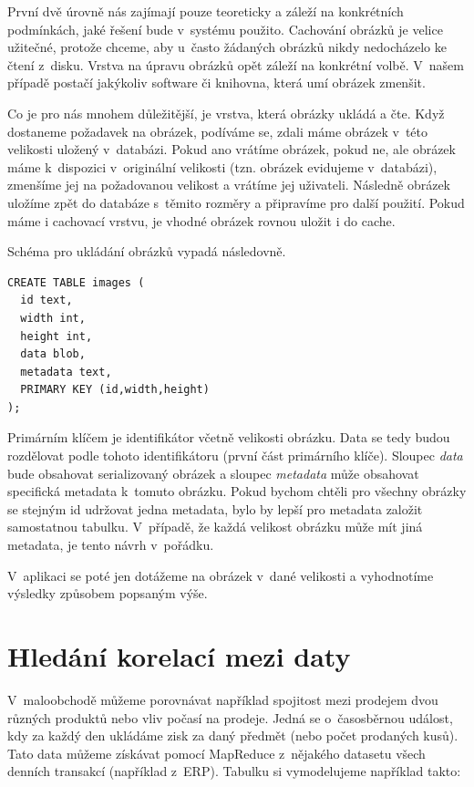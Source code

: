 První dvě úrovně nás zajímají pouze teoreticky a záleží na konkrétních podmínkách, jaké řešení bude v~systému použito. Cachování obrázků je velice užitečné, protože chceme, aby u~často žádaných obrázků nikdy nedocházelo ke čtení z~disku. Vrstva na úpravu obrázků opět záleží na konkrétní volbě. V~našem případě postačí jakýkoliv software či knihovna, která umí obrázek zmenšit. 

Co je pro nás mnohem důležitější, je vrstva, která obrázky ukládá a čte. Když dostaneme požadavek na obrázek, podíváme se, zdali máme obrázek v~této velikosti uložený v~databázi. Pokud ano vrátíme obrázek, pokud ne, ale obrázek máme k~dispozici v~originální velikosti (tzn. obrázek evidujeme v~databázi), zmenšíme jej na požadovanou velikost a vrátíme jej uživateli. Následně obrázek uložíme zpět do databáze s~těmito rozměry a připravíme pro další použití. Pokud máme i cachovací vrstvu, je vhodné obrázek rovnou uložit i do cache. 

Schéma pro ukládání obrázků vypadá následovně. 

\begin{lstlisting}[caption={Tabulka pro ukládání obrázků v~různých velikostech},label=img1]
CREATE TABLE images ( 
  id text,
  width int,
  height int,
  data blob,
  metadata text, 
  PRIMARY KEY (id,width,height) 
);
\end{lstlisting}

Primárním klíčem je identifikátor včetně velikosti obrázku. Data se tedy budou rozdělovat podle tohoto identifikátoru (první část primárního klíče). Sloupec \emph{data} bude obsahovat serializovaný obrázek a sloupec \emph{metadata} může obsahovat specifická metadata k~tomuto obrázku. Pokud bychom chtěli pro všechny obrázky se stejným id udržovat jedna metadata, bylo by lepší pro metadata založit samostatnou tabulku. V~případě, že každá velikost obrázku může mít jiná metadata, je tento návrh v~pořádku. 

V~aplikaci se poté jen dotážeme na obrázek v~dané velikosti a vyhodnotíme výsledky způsobem popsaným výše. 

\section{Hledání korelací mezi daty}
V~maloobchodě můžeme porovnávat například spojitost mezi prodejem dvou různých produktů nebo vliv počasí na prodeje. Jedná se o~časosběrnou událost, kdy za každý den ukládáme zisk za daný předmět (nebo počet prodaných kusů). Tato data můžeme získávat pomocí MapReduce z~nějakého datasetu všech denních transakcí (například z~ERP). Tabulku si vymodelujeme například takto: 


